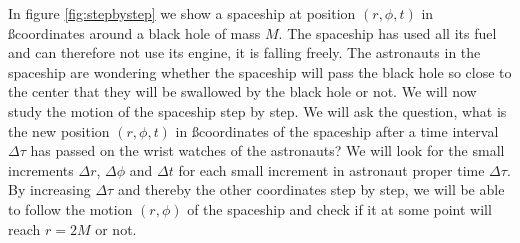\begin{multicols}{2}
In figure \ref{fig:stepbystep} we show a spaceship at position $(r,\phi,t)$ in \ss coordinates around a black hole of mass $M$. The spaceship has used all its fuel and can therefore not use its engine, it is falling freely. The astronauts in the spaceship are wondering whether the spaceship will pass the black hole so close to the center that they will be swallowed by the black hole or not. We will now study the motion of the spaceship step by step. We will ask the question, what is the new position $(r,\phi,t)$ in \ss coordinates of the spaceship after a time interval $\Delta\tau$ has passed on the wrist watches of the astronauts? We will look for the small increments $\Delta r$, $\Delta\phi$ and $\Delta t$ for each small increment in astronaut proper time $\Delta\tau$. By increasing $\Delta\tau$ and thereby the other coordinates step by step, we will be able to follow the motion $(r,\phi)$ of the spaceship and check if it at some point will reach $r=2M$ or not.


\end{multicols}
